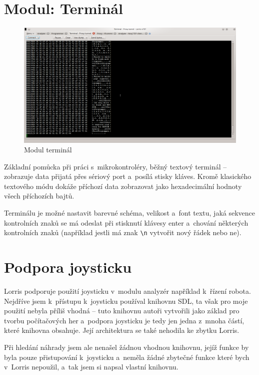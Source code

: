 \documentclass[12pt, a4paper, oneside]{article}
\begin{document}
\section{Modul: Terminál}
\begin{figure}[H]
\begin{center}
\includegraphics[width=\textwidth]{img/terminal.png}
\caption{Modul terminál}
\label{Terminal}
\end{center}
\end{figure}
Základní pomůcka při práci s~mikrokontroléry, běžný textový terminál -- zobrazuje data přijatá přes sériový port a~posílá stisky kláves. Kromě klasického textového módu dokáže příchozí data zobrazovat jako hexadecimální hodnoty všech příchozích bajtů.

Terminálu je možné nastavit barevné schéma, velikost a~font textu, jaká sekvence kontrolních znaků se má odeslat při stisknutí klávesy enter a~chování některých kontrolních znaků (například jestli má znak \verb|\n| vytvořit nový řádek nebo ne).

\newpage
\section{Podpora joysticku}
Lorris podporuje použití joysticku v~modulu analyzér například k~řízení robota. Nejdříve jsem k~přístupu k~joysticku používal knihovnu SDL\cite{sdl}, ta však pro moje použití nebyla příliš vhodná -- tuto knihovnu autoři vytvořili jako základ pro tvorbu počítačových her a~podpora joysticku je tedy jen jedna z~mnoha částí, které knihovna obsahuje. Její architektura se také nehodila ke zbytku Lorris.

Při hledání náhrady jsem ale nenašel žádnou vhodnou knihovnu, jejíž funkce by byla pouze přistupování k~joysticku a~neměla žádné zbytečné funkce které bych v~Lorris nepoužil, a~tak jsem si napsal vlastní knihovnu.
\end{document}
